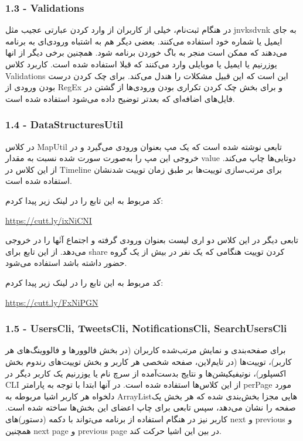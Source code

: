 \documentclass[12pt]{article}
\begin{document}
\LTR
\begin{latin}
\subsubsection*{1.3 - Validations}
\end{latin}
\RTL
در هنگام ثبت‌نام، خیلی از کاربران از وارد کردن عبارتی عجیب مثل jnvksdvnk به جای ایمیل یا شماره خود استفاده می‌کنند. بعضی دیگر هم به اشتباه ورودی‌ای به برنامه می‌دهند که ممکن است منجر به باگ خوردن برنامه شود. همچنین برخی دیگر از انها یوزرنیم یا ایمیل یا موبایلی وارد می‌کنند که قبلا استفاده شده است. کاربرد کلاس Validations این است که این قبیل مشکلات را هندل می‌کند. برای چک کردن درست بودن ورودی از RegEx و برای بخش چک کردن تکراری بودن ورودی‌ها از گشتن در فایل‌های اضافه‌ای که بعدتر توضیح داده می‌شود استفاده شده است.

\LTR
\begin{latin}
\subsubsection*{1.4 - DataStructuresUtil}
\end{latin}
\RTL
در کلاس MapUtil تابعی نوشته شده است که یک مپ بعنوان ورودی می‌گیرد و در خروجی این مپ را به‌صورت سورت شده نسبت به مقدار value دوتایی‌ها چاپ می‌کند. از این کلاس در Timeline برای مرتب‌سازی توییت‌ها بر طبق زمان توییت شدنشان استفاده شده است.

کد مربوط به این تابع را در لینک زیر پیدا کردم:

\LTR
\url{https://cutt.ly/ixNiCNI}
\RTL

تابعی دیگر در این کلاس دو اری لیست بعنوان ورودی گرفته و اجتماع آنٰها را در خروجی می‌دهد. از این تابع برای share کردن توییت هنگامی که یک نفر در بیش از یک گروه حضور داشته باشد استفاده می‌شود.

کد مربوط به این تابع را در لینک زیر پیدا کردم:

\LTR
\url{https://cutt.ly/FxNiPGN}
\RTL

\LTR
\begin{latin}
\subsubsection*{1.5 - UsersCli, TweetsCli, NotificationsCli, SearchUsersCli}
\end{latin}
\RTL
برای صفحه‌بندی و نمایش مرتب‌شده کاربران (در بخش فالوورها و فالووینگ‌های هر کاربر)، توییت‌ها (در تایم‌لاین، صفحه شخصی هر کاربر و بخش توییت‌های رندوم بخش اکسپلور)، نوتیفیکیشن‌ها و نتایج بدست‌آمده از سرچ نام یا یوزرنیم یک کاربر دیگر در CLI از این کلاس‌ها استفاده شده است. در آنها ابتدا با توجه به پارامتر perPage مورد دلخواه هر کاربر اشیا مربوطه به ArrayListهایی مجزا بخش‌بندی شده که هر بخش یک صفحه را نشان می‌دهد، سپس تابعی برای چاپ اعضای این بخش‌ها ساخته شده است. کاربر نیز در هنگام استفاده از برنامه می‌تواند با دکمه (دستور)های next و previous و همچنین next page و previous page در بین این اشیا حرکت کند.
\end{document}
